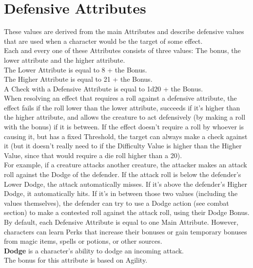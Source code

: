 \section{Defensive Attributes}\label{sec:defensiveStats}
These values are derived from the main Attributes and describe defensive values that are used when a character would be the target of some effect.\\
Each and every one of these Attributes consists of three values: The bonus, the lower attribute and the higher attribute.\\
The Lower Attribute is equal to 8 + the Bonus.\\
The Higher Attribute is equal to 21 + the Bonus.\\
A Check with a Defensive Attribute is equal to 1d20 + the Bonus.\\
When resolving an effect that requires a roll against a defensive attribute, the effect fails if the roll lower than the lower attribute, succeeds if it's higher than the higher attribute, and allows the creature to act defensively (by making a roll with the bonus) if it is between.
If the effect doesn't require a roll by whoever is causing it, but has a fixed Threshold, the target can always make a check against it (but it doesn't really need to if the Difficulty Value is higher than the Higher Value, since that would require a die roll higher than a 20).\\

For example, if a creature attacks another creature, the attacker makes an attack roll against the Dodge of the defender.
If the attack roll is below the defender's Lower Dodge, the attack automatically misses.
If it's above the defender's Higher Dodge, it automatically hits.
If it's in between those two values (including the values themselves), the defender can try to use a Dodge action (see combat section) to make a contested roll against the attack roll, using their Dodge Bonus.\\

By default, each Defensive Attribute is equal to one Main Attribute.
However, characters can learn Perks that increase their bonuses or gain temporary bonuses from magic items, spells or potions, or other sources.\\


\textbf{Dodge}\label{stat:dodge} is a character's ability to dodge an incoming attack.\\
The bonus for this attribute is based on Agility.\\

